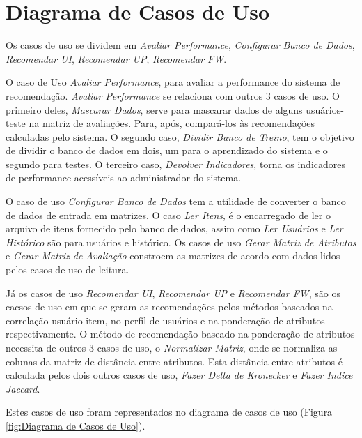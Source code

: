 \section{Diagrama de Casos de Uso} %
\label{sec:Diagrama de Casos de Uso}

Os casos de uso se dividem em \textit{Avaliar Performance}, \textit{Configurar Banco de Dados}, \textit{Recomendar UI}, \textit{Recomendar UP}, \textit{Recomendar FW}.

O caso de Uso \textit{Avaliar Performance}, para avaliar a performance do sistema de recomendação. \textit{Avaliar Performance} se relaciona com outros 3 casos de uso. O primeiro deles, \textit{Mascarar Dados}, serve para mascarar dados de alguns usuários-teste na matriz de avaliações. Para, após, compará-los às recomendações calculadas pelo sistema. O segundo caso, \textit{Dividir Banco de Treino}, tem o objetivo de dividir o banco de dados em dois, um para o aprendizado do sistema e o segundo para testes. O terceiro caso, \textit{Devolver Indicadores}, torna os indicadores de performance acessíveis ao administrador do sistema.

O caso de uso \textit{Configurar Banco de Dados} tem a utilidade de converter o banco de dados de entrada em matrizes. O caso \textit{Ler Itens}, é o encarregado de ler o arquivo de itens fornecido pelo banco de dados, assim como \textit{Ler Usuários} e \textit{Ler Histórico} são para usuários e histórico. Os casos de uso \textit{Gerar Matriz de Atributos} e \textit{Gerar Matriz de Avaliação} constroem as matrizes de acordo com dados lidos pelos casos de uso de leitura.

Já os casos de uso \textit{Recomendar UI}, \textit{Recomendar UP} e \textit{Recomendar FW}, são os cacsos de uso em que se geram as recomendações pelos métodos baseados na correlação usuário-item, no perfil de usuários e na ponderação de atributos respectivamente. O método de recomendação baseado na ponderação de atributos necessita de outros 3 casos de uso, o \textit{Normalizar Matriz}, onde se normaliza as colunas da matriz de distância entre atributos. Esta distância entre atributos é calculada pelos dois outros casos de uso, \textit{Fazer Delta de Kronecker} e \textit{Fazer Indice Jaccard}.

 Estes casos de uso foram representados no diagrama de casos de uso (Figura \ref{fig:Diagrama de Casos de Uso}).

